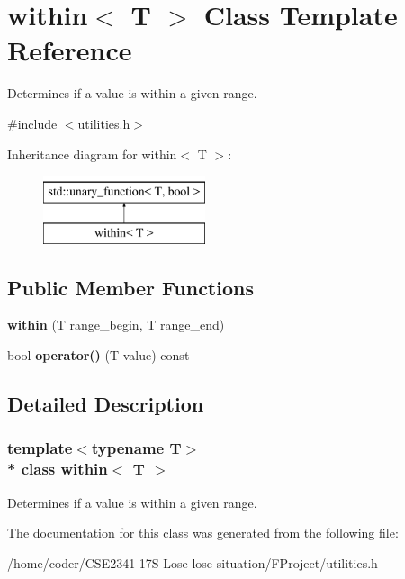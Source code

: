 \section{within$<$ T $>$ Class Template Reference}
\label{classwithin}


Determines if a value is within a given range.  




{\ttfamily \#include $<$utilities.\+h$>$}

Inheritance diagram for within$<$ T $>$\+:\begin{figure}[H]
\begin{center}
\leavevmode
\includegraphics[height=2.000000cm]{classwithin}
\end{center}
\end{figure}
\subsection*{Public Member Functions}
\begin{DoxyCompactItemize}
\item 
{\bf within} (T range\+\_\+begin, T range\+\_\+end)
\item 
bool {\bf operator()} (T value) const 
\end{DoxyCompactItemize}


\subsection{Detailed Description}
\subsubsection*{template$<$typename T$>$\\*
class within$<$ T $>$}

Determines if a value is within a given range. 

The documentation for this class was generated from the following file\+:\begin{DoxyCompactItemize}
\item 
/home/coder/\+C\+S\+E2341-\/17\+S-\/\+Lose-\/lose-\/situation/\+F\+Project/utilities.\+h\end{DoxyCompactItemize}
